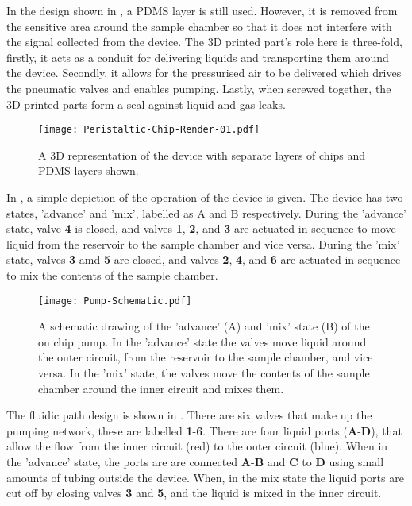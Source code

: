 In the design shown in , a PDMS layer is still used. However, it is removed from the
sensitive area around the sample chamber so that it does not interfere with the signal
collected from the device. The 3D printed part's role here is three-fold, firstly, it acts
as a conduit for delivering liquids and transporting them around the device. Secondly, it
allows for the pressurised air to be delivered which drives the pneumatic valves and
enables pumping. Lastly, when screwed together, the 3D printed parts form a seal against
liquid and gas leaks.

\begin{figure}[ht]
  \begin{center}
  \texttt{[image: Peristaltic-Chip-Render-01.pdf]}
  \caption{A 3D representation of the device with separate layers of chips and PDMS
  layers shown.}
  \label{fig:3Ddevice}
  \end{center}
\end{figure}

In , a simple depiction of the operation of the device is given. The
device has two states, 'advance' and 'mix', labelled as A and B respectively. During the 'advance'
state, valve \textbf{4} is closed, and valves \textbf{1}, \textbf{2}, and \textbf{3} are actuated in sequence to move liquid from
the reservoir to the sample chamber and vice versa. During the 'mix' state, valves \textbf{3}
amd \textbf{5} are closed, and valves \textbf{2}, \textbf{4}, and \textbf{6} are actuated in sequence
to mix the contents of the sample chamber.

\begin{figure}[ht]
  \begin{center}
  \texttt{[image: Pump-Schematic.pdf]}
  \caption{A schematic drawing of the 'advance' (A) and 'mix' state (B) of the on chip pump. In the 'advance'
  state the valves move liquid around the outer circuit, from the reservoir to the sample chamber, and vice versa.
  In the 'mix' state, the valves move the contents of the sample chamber around the inner circuit and mixes them.}
  \label{fig:OperationSchematic}
  \end{center}
\end{figure}


The fluidic path design is shown in . There are six valves that make up the pumping network,
these are labelled \textbf{1}-\textbf{6}. There are four liquid ports (\textbf{A}-\textbf{D}), that allow the
flow from the inner circuit (red) to the outer circuit (blue). When in the 'advance' state, the ports are
are connected \textbf{A}-\textbf{B} and \textbf{C} to \textbf{D} using small amounts of tubing outside the device. When,
in the mix state the liquid ports are cut off by closing valves \textbf{3} and \textbf{5}, and the liquid is mixed in the
inner circuit.

